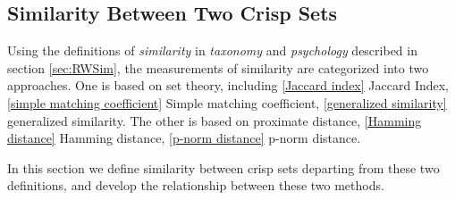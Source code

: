 \subsection{Similarity Between Two Crisp Sets}
\label{sec:crispSim}
Using the definitions of \textit{similarity} in \textit{taxonomy} and \textit{psychology} described in section \ref{sec:RWSim}, the measurements of similarity are categorized into two approaches. One is based on set theory, including \eqref{Jaccard index} Jaccard Index, \eqref{simple matching coefficient} Simple matching coefficient, \eqref{generalized similarity} generalized similarity.
The other is based on proximate distance, \eqref{Hamming distance} Hamming distance, \eqref{p-norm distance} p-norm distance.

In this section we define similarity between crisp sets departing from these two definitions, and develop the relationship between these two methods.


